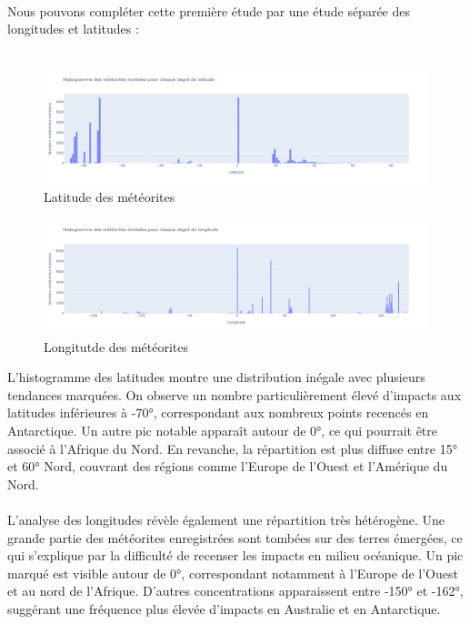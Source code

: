 \documentclass[12pt]{article}
\begin{document}
\\
Nous pouvons compléter cette première étude par une étude séparée des longitudes et latitudes :\\
\\
\begin{figure}[H]
\centering
\includegraphics[width=17cm]{Images/exploration/histogramme_latitude.png}
\caption{Latitude des météorites}
\end{figure}
\begin{figure}[H]
\centering
\includegraphics[width=17cm]{Images/exploration/histogramme_longitude.png}
\caption{Longitutde des météorites}
\end{figure}
L'histogramme des latitudes montre une distribution inégale avec plusieurs tendances marquées. On observe un nombre particulièrement élevé d'impacts aux latitudes inférieures à -70°, correspondant aux nombreux points recencés en Antarctique. Un autre pic notable apparaît autour de 0°, ce qui pourrait être associé à l'Afrique du Nord. En revanche, la répartition est plus diffuse entre 15° et 60° Nord, couvrant des régions comme l'Europe de l'Ouest et l'Amérique du Nord.\\
\\
L'analyse des longitudes révèle également une répartition très hétérogène. Une grande partie des météorites enregistrées sont tombées sur des terres émergées, ce qui s'explique par la difficulté de recenser les impacts en milieu océanique. Un pic marqué est visible autour de 0°, correspondant notamment à l'Europe de l'Ouest et au nord de l'Afrique. D'autres concentrations apparaissent entre -150° et -162°, suggérant une fréquence plus élevée d'impacts en Australie et en Antarctique.\\
\end{document}
